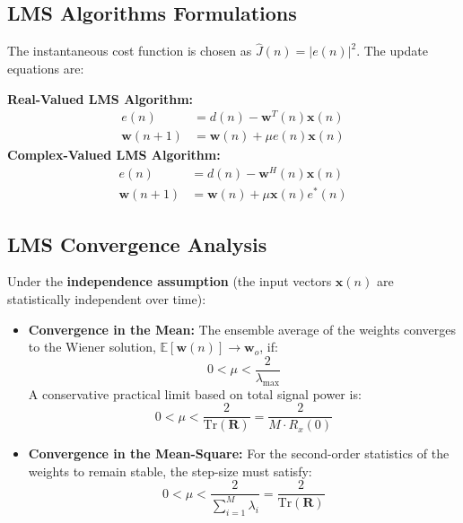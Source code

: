 \documentclass[12pt,a4paper]{article}
\begin{document}
\subsection{LMS Algorithms Formulations}
The instantaneous cost function is chosen as $\hat{J}(n) = |e(n)|^2$. The update equations are:
\begin{tcolorbox}[defbox, title={LMS Update Equations}]
\textbf{Real-Valued LMS Algorithm:}
\begin{align}
  e(n) &= d(n) - \mathbf{w}^T(n) \mathbf{x}(n) \\
  \mathbf{w}(n+1) &= \mathbf{w}(n) + \mu e(n) \mathbf{x}(n)
\end{align}
\textbf{Complex-Valued LMS Algorithm:}
\begin{align}
  e(n) &= d(n) - \mathbf{w}^H(n) \mathbf{x}(n) \\
  \mathbf{w}(n+1) &= \mathbf{w}(n) + \mu \mathbf{x}(n) e^*(n)
\end{align}
\end{tcolorbox}

\subsection{LMS Convergence Analysis}
Under the \textbf{independence assumption} (the input vectors $\mathbf{x}(n)$ are statistically independent over time):
\begin{itemize}[leftmargin=*, itemsep=3pt]
  \item \textbf{Convergence in the Mean:} The ensemble average of the weights converges to the Wiener solution, $\mathbb{E}[\mathbf{w}(n)] \to \mathbf{w}_o$, if:
  \begin{equation}
    0 < \mu < \frac{2}{\lambda_{\text{max}}}
  \end{equation}
  A conservative practical limit based on total signal power is:
  \begin{equation}
    0 < \mu < \frac{2}{\text{Tr}(\mathbf{R})} = \frac{2}{M \cdot R_x(0)}
  \end{equation}
  \item \textbf{Convergence in the Mean-Square:} For the second-order statistics of the weights to remain stable, the step-size must satisfy:
  \begin{equation}
    0 < \mu < \frac{2}{\sum_{i=1}^M \lambda_i} = \frac{2}{\text{Tr}(\mathbf{R})}
  \end{equation}
\end{itemize}
\end{document}
